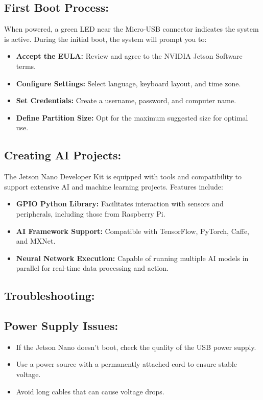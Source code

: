 \subsection{First Boot Process:}
When powered, a green LED near the Micro-USB connector indicates the system is active. During the initial boot, the system will prompt you to:

\begin{itemize}
	\item \textbf{Accept the EULA:} Review and agree to the NVIDIA Jetson Software terms.
	\item \textbf{Configure Settings:} Select language, keyboard layout, and time zone.
	\item \textbf{Set Credentials:} Create a username, password, and computer name.
	\item \textbf{Define Partition Size:} Opt for the maximum suggested size for optimal use.
\end{itemize}

\subsection{Creating AI Projects:}
The Jetson Nano Developer Kit is equipped with tools and compatibility to support extensive AI and machine learning projects. Features include:
\begin{itemize}
	\item \textbf{GPIO Python Library:} Facilitates interaction with sensors and peripherals, including those from Raspberry Pi.
	\item \textbf{AI Framework Support:} Compatible with TensorFlow, PyTorch, Caffe, and MXNet.
	\item \textbf{Neural Network Execution:} Capable of running multiple AI models in parallel for real-time data processing and action.
\end{itemize}

\subsection{Troubleshooting:}
\subsection*{Power Supply Issues:}
\begin{itemize}
	\item If the Jetson Nano doesn’t boot, check the quality of the USB power supply.
	\item Use a power source with a permanently attached cord to ensure stable voltage.
	\item Avoid long cables that can cause voltage drops.
\end{itemize}



